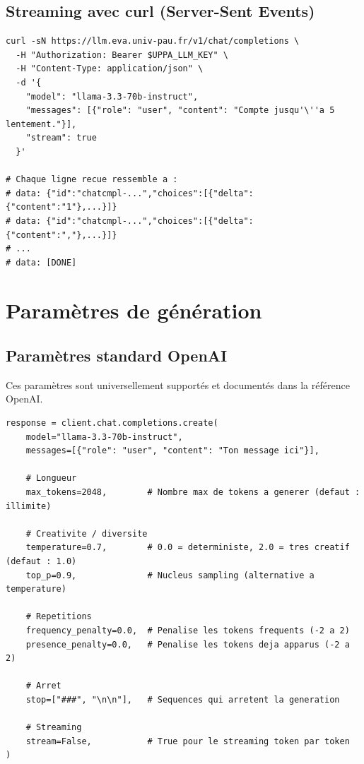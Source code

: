 \documentclass[12pt, a4paper, twoside]{article}
\begin{document}
\subsection{Streaming avec curl (Server-Sent Events)}

\begin{lstlisting}[style=bashstyle, caption={Streaming SSE avec curl}]
curl -sN https://llm.eva.univ-pau.fr/v1/chat/completions \
  -H "Authorization: Bearer $UPPA_LLM_KEY" \
  -H "Content-Type: application/json" \
  -d '{
    "model": "llama-3.3-70b-instruct",
    "messages": [{"role": "user", "content": "Compte jusqu'\''a 5 lentement."}],
    "stream": true
  }'

# Chaque ligne recue ressemble a :
# data: {"id":"chatcmpl-...","choices":[{"delta":{"content":"1"},...}]}
# data: {"id":"chatcmpl-...","choices":[{"delta":{"content":","},...}]}
# ...
# data: [DONE]
\end{lstlisting}

\section{Paramètres de génération}
\label{sec:parametres}

\subsection{Paramètres standard OpenAI}

Ces paramètres sont universellement supportés et documentés dans la référence OpenAI.

\begin{lstlisting}[style=pythonstyle, caption={Tous les paramètres standard supportés}]
response = client.chat.completions.create(
    model="llama-3.3-70b-instruct",
    messages=[{"role": "user", "content": "Ton message ici"}],

    # Longueur
    max_tokens=2048,        # Nombre max de tokens a generer (defaut : illimite)

    # Creativite / diversite
    temperature=0.7,        # 0.0 = deterministe, 2.0 = tres creatif (defaut : 1.0)
    top_p=0.9,              # Nucleus sampling (alternative a temperature)

    # Repetitions
    frequency_penalty=0.0,  # Penalise les tokens frequents (-2 a 2)
    presence_penalty=0.0,   # Penalise les tokens deja apparus (-2 a 2)

    # Arret
    stop=["###", "\n\n"],   # Sequences qui arretent la generation

    # Streaming
    stream=False,           # True pour le streaming token par token
)
\end{lstlisting}
\end{document}
